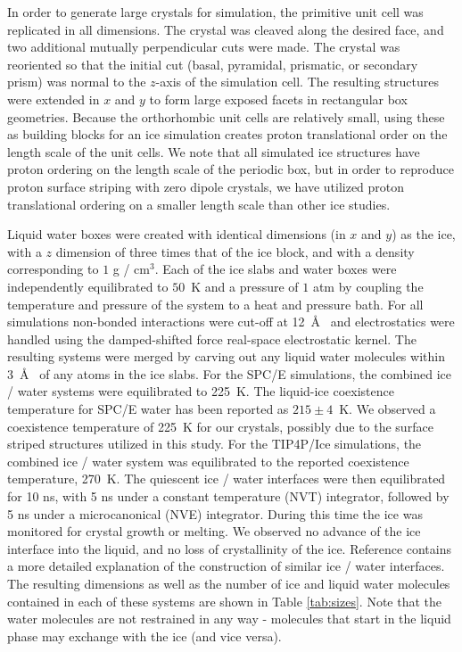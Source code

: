 In order to generate large crystals for simulation, the primitive unit
cell was replicated in all dimensions. The crystal was cleaved along
the desired face, and two additional mutually perpendicular cuts were
made.  The crystal was reoriented so that the initial cut (basal,
pyramidal, prismatic, or secondary prism) was normal to the $z$-axis
of the simulation cell.  The resulting structures were extended in $x$
and $y$ to form large exposed facets in rectangular box geometries.
Because the orthorhombic unit cells are relatively small, using these
as building blocks for an ice simulation creates proton translational
order on the length scale of the unit cells. We note that all
simulated ice structures have proton ordering on the length scale of
the periodic box, but in order to reproduce proton surface striping
with zero dipole crystals, we have utilized proton translational
ordering on a smaller length scale than other ice studies.

Liquid water boxes were created with identical dimensions (in $x$ and
$y$) as the ice, with a $z$ dimension of three times that of the ice
block, and with a density corresponding to $1$ g / cm$^3$.  Each of
the ice slabs and water boxes were independently equilibrated to
$50$~K and a pressure of $1$ atm by coupling the temperature and
pressure of the system to a heat and pressure bath. For all
simulations non-bonded interactions were cut-off at 12~\AA~ and
electrostatics were handled using the damped-shifted force real-space
electrostatic kernel.\cite{Fennell2006} The resulting systems were
merged by carving out any liquid water molecules within 3~\AA~ of any
atoms in the ice slabs.  For the SPC/E simulations, the combined ice /
water systems were equilibrated to 225~K. The liquid-ice coexistence
temperature for SPC/E water has been reported as
$215 \pm 4$~K.\cite{Vega2006a,Fernandez2006} We observed a coexistence
temperature of 225~K for our crystals, possibly due to the surface
striped structures utilized in this study. For the TIP4P/Ice
simulations, the combined ice / water system was equilibrated to the
reported coexistence temperature, 270~K.\cite{Vega2006a,Fernandez2006}
The quiescent ice / water interfaces were then equilibrated for 10 ns,
with 5 ns under a constant temperature (NVT) integrator, followed by 5
ns under a microcanonical (NVE) integrator.  During this time the ice
was monitored for crystal growth or melting. We observed no advance of
the ice interface into the liquid, and no loss of crystallinity of the
ice. Reference  contains a more detailed
explanation of the construction of similar ice / water interfaces. The
resulting dimensions as well as the number of ice and liquid water
molecules contained in each of these systems are shown in Table
\ref{tab:sizes}.  Note that the water molecules are not restrained in
any way - molecules that start in the liquid phase may exchange with
the ice (and vice versa).

